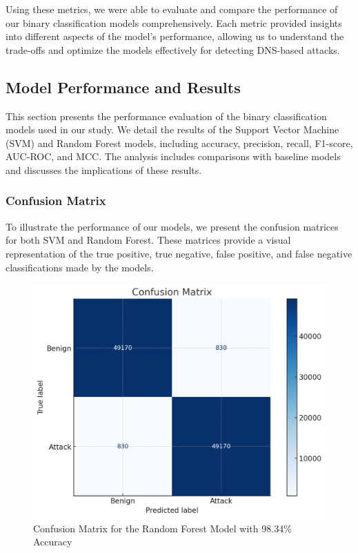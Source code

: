 Using these metrics, we were able to evaluate and compare the performance of our binary classification models comprehensively. Each metric provided insights into different aspects of the model’s performance, allowing us to understand the trade-offs and optimize the models effectively for detecting DNS-based attacks.



\subsection{Model Performance and Results}


This section presents the performance evaluation of the binary classification models used in our study. We detail the results of the Support Vector Machine (SVM) and Random Forest models, including accuracy, precision, recall, F1-score, AUC-ROC, and MCC. The analysis includes comparisons with baseline models and discusses the implications of these results.

\subsubsection{Confusion Matrix}
To illustrate the performance of our models, we present the confusion matrices for both SVM and Random Forest. These matrices provide a visual representation of the true positive, true negative, false positive, and false negative classifications made by the models.


\begin{figure}[ht!]
    \centering
    \includegraphics[width=1\linewidth]{Chap3/images/matrix de confusion.png}
    \caption{Confusion Matrix for the Random Forest Model with 98.34\% Accuracy}
    \label{fig:confusion_matrix}
\end{figure}



